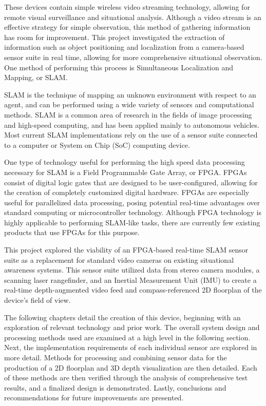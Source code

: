 These devices contain simple wireless video streaming technology, allowing for remote visual surveillance and situational analysis. Although a video stream is an effective strategy for simple observation, this method of gathering information has room for improvement. This project investigated the extraction of information such as object positioning and localization from a camera-based sensor suite in real time, allowing for more comprehensive situational observation. One method of performing this process is Simultaneous Localization and Mapping, or SLAM.
\par
SLAM is the technique of mapping an unknown environment with respect to an agent, and can be performed using a wide variety of sensors and computational methods. SLAM is a common area of research in the fields of image processing and high-speed computing, and has been applied mainly to autonomous vehicles. Most current SLAM implementations rely on the use of a sensor suite connected to a computer or System on Chip (SoC) computing device.
\par
One type of technology useful for performing the high speed data processing necessary for SLAM is a Field Programmable Gate Array, or FPGA. FPGAs consist of digital logic gates that are designed to be user-configured, allowing for the creation of completely customized digital hardware. FPGAs are especially useful for parallelized data processing, posing potential real-time advantages over standard computing or microcontroller technology. Although FPGA technology is highly applicable to performing SLAM-like tasks, there are currently few existing products that use FPGAs for this purpose.
\par
This project explored the viability of an FPGA-based real-time SLAM sensor suite as a replacement for standard video cameras on existing situational awareness systems. This sensor suite utilized data from stereo camera modules, a scanning laser rangefinder, and an Inertial Measurement Unit (IMU) to create a real-time depth-augmented video feed and compass-referenced 2D floorplan of the device's field of view.
\par
The following chapters detail the creation of this device, beginning with an exploration of relevant technology and prior work. The overall system design and processing methods used are examined at a high level in the following section. Next, the implementation requirements of each individual sensor are explored in more detail. Methods for processing and combining sensor data for the production of a 2D floorplan and 3D depth visualization are then detailed. Each of these methods are then verified through the analysis of comprehensive test results, and a finalized design is demonstrated. Lastly, conclusions and recommendations for future improvements are presented.




